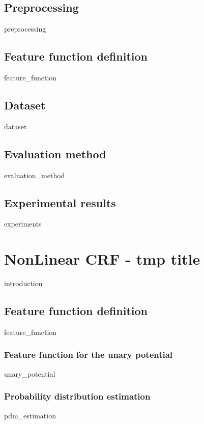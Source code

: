 \documentclass[12pt]{report}
\begin{document}
\section{Preprocessing}
\label{sec:linear_preprocessing}
{preprocessing}

\section{Feature function definition}	
{feature_function}

\section{Dataset}	
\label{sec:linear_dataset}
{dataset}

\section{Evaluation method}	
{evaluation_method}

\section{Experimental results}	
{experiments}




\chapter{NonLinear CRF - tmp title}
\label{chapter:nonlinear}
{introduction}

\section{Feature function definition}
{feature_function}

\subsection{Feature function for the unary potential}
{unary_potential}

\subsection{Probability distribution estimation}
{pdm_estimation}
\end{document}
